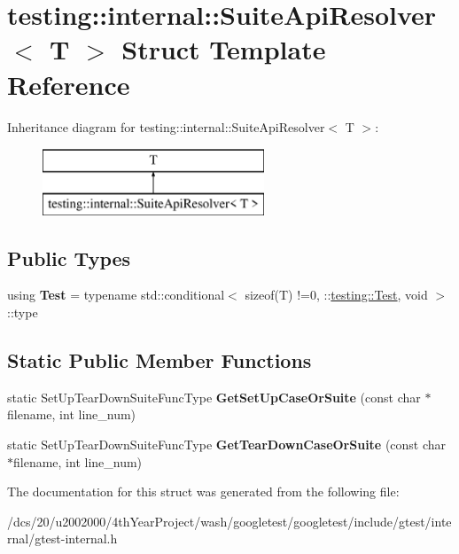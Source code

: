 \hypertarget{structtesting_1_1internal_1_1SuiteApiResolver}{}\section{testing\+:\+:internal\+:\+:Suite\+Api\+Resolver$<$ T $>$ Struct Template Reference}
\label{structtesting_1_1internal_1_1SuiteApiResolver}
Inheritance diagram for testing\+:\+:internal\+:\+:Suite\+Api\+Resolver$<$ T $>$\+:\begin{figure}[H]
\begin{center}
\leavevmode
\includegraphics[height=2.000000cm]{structtesting_1_1internal_1_1SuiteApiResolver}
\end{center}
\end{figure}
\subsection*{Public Types}
\begin{DoxyCompactItemize}
\item 
\mbox{\label{structtesting_1_1internal_1_1SuiteApiResolver_a343c36f492a946d302b1cfc930266768}} 
using {\bfseries Test} = typename std\+::conditional$<$ sizeof(T) !=0, \+::\mbox{\hyperlink{classtesting_1_1Test}{testing\+::\+Test}}, void $>$\+::type
\end{DoxyCompactItemize}
\subsection*{Static Public Member Functions}
\begin{DoxyCompactItemize}
\item 
\mbox{\label{structtesting_1_1internal_1_1SuiteApiResolver_abae647b1fed9422fc596fd385de6dd5b}} 
static Set\+Up\+Tear\+Down\+Suite\+Func\+Type {\bfseries Get\+Set\+Up\+Case\+Or\+Suite} (const char $\ast$filename, int line\+\_\+num)
\item 
\mbox{\label{structtesting_1_1internal_1_1SuiteApiResolver_a60e647dc7974c2e834812c491cbbca25}} 
static Set\+Up\+Tear\+Down\+Suite\+Func\+Type {\bfseries Get\+Tear\+Down\+Case\+Or\+Suite} (const char $\ast$filename, int line\+\_\+num)
\end{DoxyCompactItemize}


The documentation for this struct was generated from the following file\+:\begin{DoxyCompactItemize}
\item 
/dcs/20/u2002000/4th\+Year\+Project/wash/googletest/googletest/include/gtest/internal/gtest-\/internal.\+h\end{DoxyCompactItemize}
